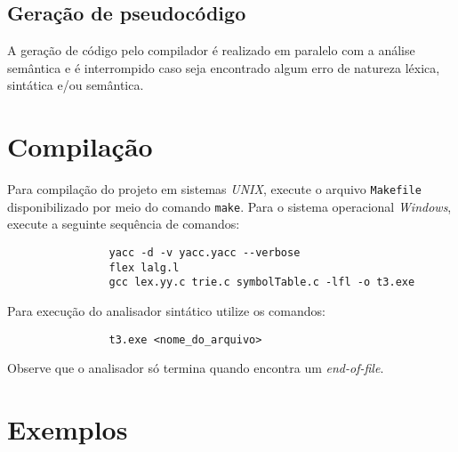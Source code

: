 \documentclass{article}
\begin{document}

	\subsection{Geração de pseudocódigo} %
	\label{sub:geracao_de_pseudocodigo}
		A geração de código pelo compilador é realizado em paralelo com a análise semântica e é interrompido caso seja encontrado algum erro de natureza léxica, sintática e/ou semântica.



\section{Compilação} %
\label{sec:compilacao}
	Para compilação do projeto em sistemas \emph{UNIX}, execute o arquivo \verb=Makefile= disponibilizado por meio do comando \verb=make=. Para o sistema operacional \emph{Windows}, execute a seguinte sequência de comandos:

	\begin{center}
		\begin{minipage}[ht]{0.5\textwidth}
			\begin{verbatim}
				yacc -d -v yacc.yacc --verbose 
				flex lalg.l
				gcc lex.yy.c trie.c symbolTable.c -lfl -o t3.exe
			\end{verbatim}
		\end{minipage}
	\end{center}

	Para execução do analisador sintático utilize os comandos:

	\begin{center}
		\begin{minipage}[ht]{0.5\textwidth}
			\begin{verbatim}
				t3.exe <nome_do_arquivo>
			\end{verbatim}
		\end{minipage}
	\end{center}

	Observe que o analisador só termina quando encontra um \emph{end-of-file}.

\section{Exemplos} %
\label{sec:exemplos}

\end{document}
